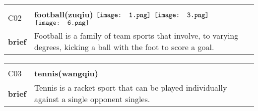 \documentclass[UTF8]{article}
\begin{document}
            \begin{tabularx}{\textwidth}{p{1.5cm}X}
            \arrayrulecolor{myBlue}
        	\hline\\
            \small{C02}&
            \large{\bfseries{football(zuqiu)}}\hfill
                                                            $\vcenter{\hbox{\texttt{[image: 1.png]}}}$
                                                                \phantom{$\vcenter{\hbox{\texttt{[image: 2.png]}}}$}
                                                                $\vcenter{\hbox{\texttt{[image: 3.png]}}}$
                                                                \phantom{$\vcenter{\hbox{\texttt{[image: 4.png]}}}$}
                                                                \phantom{$\vcenter{\hbox{\texttt{[image: 5.png]}}}$}
                                                                $\vcenter{\hbox{\texttt{[image: 6.png]}}}$
                                                                \phantom{$\vcenter{\hbox{\texttt{[image: 7.png]}}}$}
                                        \\[10pt]
            \large{\bfseries{brief}}&\noindent\parbox[c]{\hsize}{Football is a family of team sports that involve, to varying degrees, kicking a ball with the foot to score a goal. } \\[5pt]
            \hline\\[-10pt]
        \end{tabularx}
            \begin{tabularx}{\textwidth}{p{1.5cm}X}
            \arrayrulecolor{myBlue}
        	\hline\\
            \small{C03}&
            \large{\bfseries{tennis(wangqiu)}}\hfill
                                                            \phantom{$\vcenter{\hbox{\texttt{[image: 1.png]}}}$}
                                                                \phantom{$\vcenter{\hbox{\texttt{[image: 2.png]}}}$}
                                                                \phantom{$\vcenter{\hbox{\texttt{[image: 3.png]}}}$}
                                                                \phantom{$\vcenter{\hbox{\texttt{[image: 4.png]}}}$}
                                                                \phantom{$\vcenter{\hbox{\texttt{[image: 5.png]}}}$}
                                                                \phantom{$\vcenter{\hbox{\texttt{[image: 6.png]}}}$}
                                                                \phantom{$\vcenter{\hbox{\texttt{[image: 7.png]}}}$}
                                        \\[10pt]
            \large{\bfseries{brief}}&\noindent\parbox[c]{\hsize}{Tennis is a racket sport that can be played individually against a single opponent singles. } \\[5pt]
            \hline\\[-10pt]
        \end{tabularx}
\end{document}
